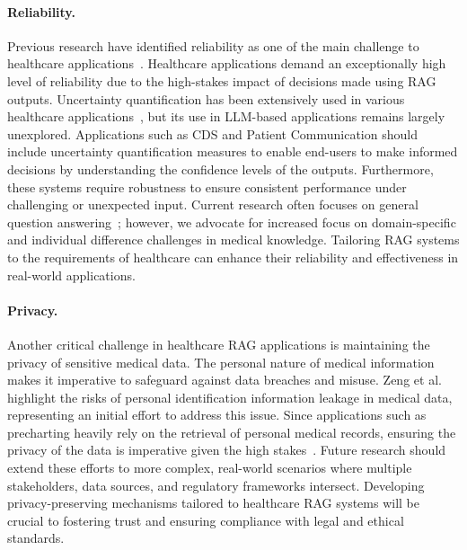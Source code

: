 \paragraph{Reliability.}
 Previous research have identified reliability as one of the main challenge to healthcare applications~\cite{HE2025102963}. Healthcare applications demand an exceptionally high level of reliability due to the high-stakes impact of decisions made using RAG outputs. Uncertainty quantification has been extensively used in various healthcare applications~\cite{SEONI2023107441}, but its use in LLM-based applications remains largely unexplored. Applications such as CDS and Patient Communication should include uncertainty quantification measures to enable end-users to make informed decisions by understanding the confidence levels of the outputs. Furthermore, these systems require robustness to ensure consistent performance under challenging or unexpected input. Current research often focuses on general question answering~\cite{ni2024trustworthyknowledgegraphreasoning,luo2024rog, sun2023thinkongraph}; however, we advocate for increased focus on domain-specific and individual difference challenges in medical knowledge. Tailoring RAG systems to the requirements of healthcare can enhance their reliability and effectiveness in real-world applications.

\paragraph{Privacy.}
Another critical challenge in healthcare RAG applications is maintaining the privacy of sensitive medical data. The personal nature of medical information makes it imperative to safeguard against data breaches and misuse. Zeng et al.~\cite{privacy_rag_2024} highlight the risks of personal identification information leakage in medical data, representing an initial effort to address this issue. Since applications such as precharting heavily rely on the retrieval of personal medical records, ensuring the privacy of the data is imperative given the high stakes~\cite{Bowman2021EMR}. Future research should extend these efforts to more complex, real-world scenarios where multiple stakeholders, data sources, and regulatory frameworks intersect. Developing privacy-preserving mechanisms tailored to healthcare RAG systems will be crucial to fostering trust and ensuring compliance with legal and ethical standards.

